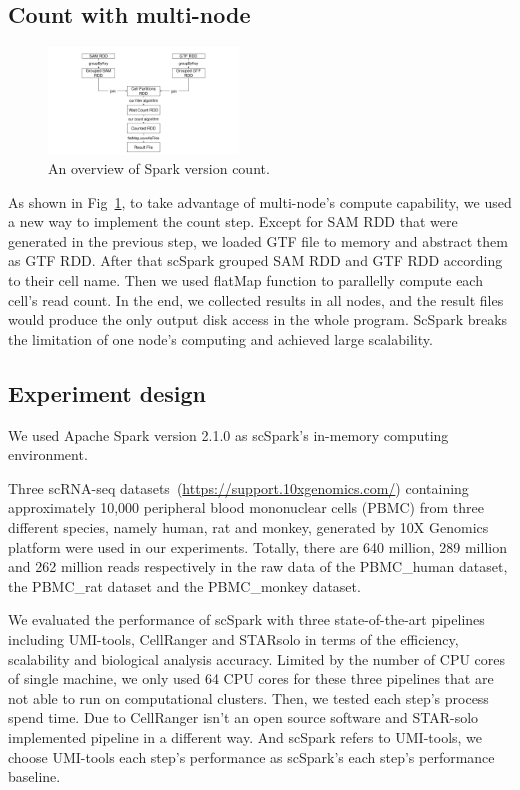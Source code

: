\documentclass[conference]{IEEEtran}
\begin{document}
\subsection{Count with multi-node}
\begin{figure}
	\includegraphics[width=0.45\textwidth]{Fig3.pdf}
	\caption{An overview of Spark version count.} \label{fig3}
\end{figure}
As shown in Fig~\ref{fig3}, to take advantage of multi-node's compute capability, we used a new way to implement the count step. 
Except for SAM RDD that were generated in the previous step, we loaded GTF file to memory and abstract them as GTF RDD. 
After that scSpark grouped SAM RDD and GTF RDD according to their cell name. 
Then we used flatMap function to parallelly compute each cell's read count. 
In the end, we collected results in all nodes, and the result files would produce the only output disk access in the whole program. 
ScSpark breaks the limitation of one node's computing and achieved large scalability. 

\subsection{Experiment design}
We used Apache Spark version 2.1.0 as scSpark's in-memory computing environment.

Three scRNA-seq datasets~(\url{https://support.10xgenomics.com/}) containing approximately 10,000 peripheral blood mononuclear cells (PBMC) from three different species, namely human, rat and monkey, generated by 10X Genomics platform were used in our experiments. Totally, there are 640 million, 289 million and 262 million reads respectively in the raw data of the PBMC\_human dataset, the PBMC\_rat dataset and the PBMC\_monkey dataset.

We evaluated the performance of scSpark with three state-of-the-art pipelines including UMI-tools, CellRanger and STARsolo in terms of the efficiency, scalability and biological analysis accuracy.
Limited by the number of CPU cores of single machine, we only used 64 CPU cores for these three pipelines that are not able to run on computational clusters.
Then, we tested each step's process spend time.
Due to CellRanger isn't an open source software and STAR-solo implemented pipeline in a different way.
And scSpark refers to UMI-tools, we choose UMI-tools each step's performance as scSpark's each step's performance baseline.
\end{document}
